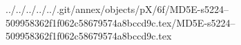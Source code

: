 ../../../../../.git/annex/objects/pX/6f/MD5E-s5224--509958362f1f062c58679574a8bccd9c.tex/MD5E-s5224--509958362f1f062c58679574a8bccd9c.tex
